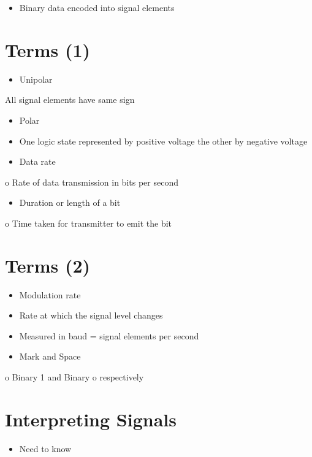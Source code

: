 \documentclass[10pt]{article}
\begin{document}
\begin{itemize}
  \item Binary data encoded into signal elements
\end{itemize}

\section{Terms (1)}
\begin{itemize}
  \item Unipolar
\end{itemize}

All signal elements have same sign

\begin{itemize}
  \item Polar

  \item One logic state represented by positive voltage the other by negative voltage

  \item Data rate

\end{itemize}

o Rate of data transmission in bits per second

\begin{itemize}
  \item Duration or length of a bit
\end{itemize}

o Time taken for transmitter to emit the bit

\section{Terms (2)}
\begin{itemize}
  \item Modulation rate

  \item Rate at which the signal level changes

  \item Measured in baud = signal elements per second

  \item Mark and Space

\end{itemize}

o Binary 1 and Binary o respectively

\section{Interpreting Signals}
\begin{itemize}
  \item Need to know
\end{itemize}
\end{document}
